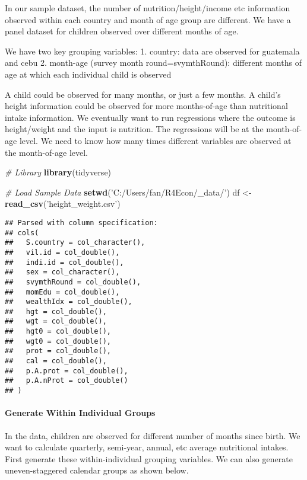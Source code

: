 \documentclass[
]{book}
\newenvironment{Shaded}{\begin{snugshade}}{\end{snugshade}}
\newcommand{\CommentTok}[1]{\textcolor[rgb]{0.56,0.35,0.01}{\textit{#1}}}
\newcommand{\KeywordTok}[1]{\textcolor[rgb]{0.13,0.29,0.53}{\textbf{#1}}}
\newcommand{\NormalTok}[1]{#1}
\newcommand{\StringTok}[1]{\textcolor[rgb]{0.31,0.60,0.02}{#1}}
\begin{document}
In our sample dataset, the number of nutrition/height/income etc information observed within each country and month of age group are different. We have a panel dataset for children observed over different months of age.

We have two key grouping variables:
1. country: data are observed for guatemala and cebu
2. month-age (survey month round=svymthRound): different months of age at which each individual child is observed

A child could be observed for many months, or just a few months. A child's height information could be observed for more months-of-age than nutritional intake information. We eventually want to run regressions where the outcome is height/weight and the input is nutrition. The regressions will be at the month-of-age level. We need to know how many times different variables are observed at the month-of-age level.

\begin{Shaded}
\begin{Highlighting}[]
\CommentTok{# Library}
\KeywordTok{library}\NormalTok{(tidyverse)}

\CommentTok{# Load Sample Data}
\KeywordTok{setwd}\NormalTok{(}\StringTok{'C:/Users/fan/R4Econ/_data/'}\NormalTok{)}
\NormalTok{df <-}\StringTok{ }\KeywordTok{read_csv}\NormalTok{(}\StringTok{'height_weight.csv'}\NormalTok{)}
\end{Highlighting}
\end{Shaded}

\begin{verbatim}
## Parsed with column specification:
## cols(
##   S.country = col_character(),
##   vil.id = col_double(),
##   indi.id = col_double(),
##   sex = col_character(),
##   svymthRound = col_double(),
##   momEdu = col_double(),
##   wealthIdx = col_double(),
##   hgt = col_double(),
##   wgt = col_double(),
##   hgt0 = col_double(),
##   wgt0 = col_double(),
##   prot = col_double(),
##   cal = col_double(),
##   p.A.prot = col_double(),
##   p.A.nProt = col_double()
## )
\end{verbatim}

\hypertarget{generate-within-individual-groups}{%
\paragraph{Generate Within Individual Groups}\label{generate-within-individual-groups}}

In the data, children are observed for different number of months since birth. We want to calculate quarterly, semi-year, annual, etc average nutritional intakes. First generate these within-individual grouping variables. We can also generate uneven-staggered calendar groups as shown below.
\end{document}
